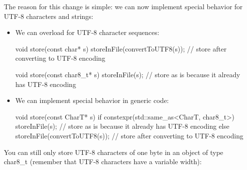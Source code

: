 The reason for this change is simple: we can now implement special behavior for UTF-8 characters and strings:

\begin{itemize}
\item 
We can overload for UTF-8 character sequences:

\begin{cpp}
void store(const char* s)
{
	storeInFile(convertToUTF8(s)); // store after converting to UTF-8 encoding
}

void store(const char8_t* s)
{
	storeInFile(s); // store as is because it already has UTF-8 encoding
}
\end{cpp}

\item 
We can implement special behavior in generic code:

\begin{cpp}
void store(const CharT* s)
{
	if constexpr(std::same_as<CharT, char8_t>) {
		storeInFile(s); // store as is because it already has UTF-8 encoding
	}
	else {
		storeInFile(convertToUTF8(s)); // store after converting to UTF-8 encoding
	}
}
\end{cpp}

\end{itemize}

You can still only store UTF-8 characters of one byte in an object of type char8\_t (remember that UTF-8 characters have a variable width):

